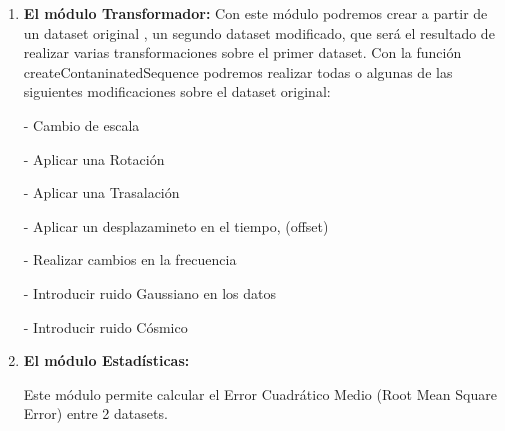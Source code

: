 \begin{enumerate}
\begin{description}
    \end{description}


\item \textbf{El módulo Transformador:}
	Con este módulo podremos crear a partir de un dataset original , un segundo dataset modificado, que será el resultado de realizar varias transformaciones sobre el primer dataset. Con la función createContaninatedSequence podremos realizar todas o algunas de las siguientes modificaciones sobre el dataset original:

		- Cambio de escala

		- Aplicar una Rotación

		- Aplicar una Trasalación

		- Aplicar un desplazamineto en el tiempo, (offset)

        - Realizar cambios en la frecuencia

        - Introducir ruido Gaussiano en los datos

        - Introducir ruido Cósmico


\item \textbf{El módulo Estadísticas:}

	Este módulo permite calcular el Error Cuadrático Medio (Root Mean Square Error) entre 2 datasets.

\end{enumerate}

\clearpage

